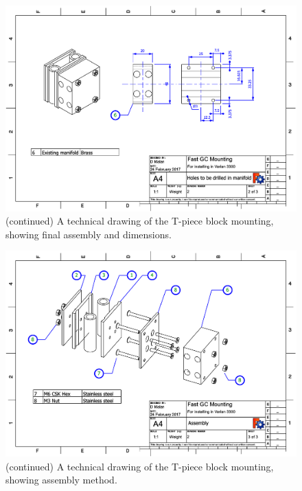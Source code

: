 \begin{figure}
	\ContinuedFloat
	\centering
	\includegraphics[angle=90, origin=c, scale=0.75]{Figures/CarDrawing2.pdf}
	\decoRule	
	
	\caption[]{(continued) A technical drawing of the T-piece block mounting,
	showing final assembly and dimensions.}
	
\end{figure}

\begin{figure}
	\ContinuedFloat
	\centering
	\includegraphics[angle=90, origin=c, scale=0.75]{Figures/CarDrawing3.pdf}
	\decoRule	
	
	\caption[]{(continued) A technical drawing of the T-piece block mounting, showing assembly method.} 
	
\end{figure}

